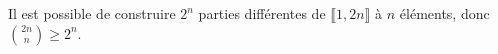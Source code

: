 Il est possible de construire $2^n$ parties différentes de $\llbracket 1, 2n \rrbracket$ à $n$ éléments, donc $\binom {2n}n \geq 2^n$.

\begin{reponses}
\end{reponses}

